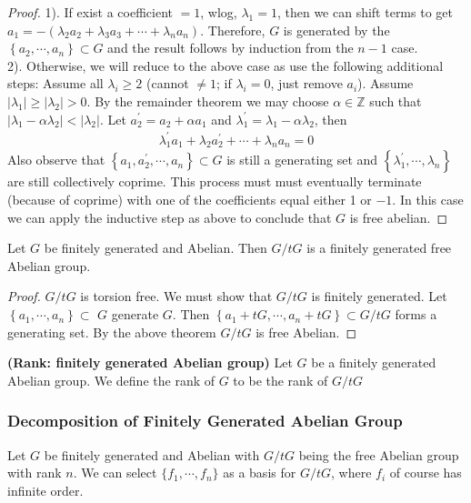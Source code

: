 \documentclass{article}
\newcommand{\bfs}[1]{\textbf{({#1}) }}
\begin{document}
\begin{proof}
1). If exist a coefficient $=1$, wlog, $\lambda_{1}=1$, then we can shift terms to get $a_{1}=-\left(\lambda_{2} a_{2}+\lambda_{3} a_{3}+\cdots+\lambda_{n} a_{n}\right) .$ Therefore, $G$ is generated by the $\left\{a_{2}, \cdots, a_{n}\right\} \subset G$ and the result follows by induction from the $n-1$ case. \\
2). Otherwise, we will reduce to the above case as use the following additional steps: Assume all $\lambda_i\ge 2$ (cannot $\ne 1$; if $\lambda_i=0$, just remove $a_i$). Assume $\left|\lambda_{1}\right| \geq\left|\lambda_{2}\right|>0 .$ By the remainder theorem we may choose $\alpha \in \mathbb{Z}$ such that $\left|\lambda_{1}-\alpha \lambda_{2}\right|<\left|\lambda_{2}\right| .$ Let $a_{2}^{\prime}=a_{2}+\alpha a_{1}$ and $\lambda_{1}^{\prime}=\lambda_{1}-\alpha \lambda_{2}$, then
\begin{align*}
\lambda_{1}^{\prime} a_{1}+\lambda_{2} a_{2}^{\prime}+\cdots+\lambda_{n} a_{n}=0
\end{align*}
Also observe that $\left\{a_{1}, a_{2}^{\prime}, \cdots, a_{n}\right\} \subset G$ is still a generating set and $\left\{\lambda_{1}^{\prime}, \cdots, \lambda_{n}\right\}$ are still collectively coprime. This process must must eventually terminate (because of coprime) with one of the coefficients equal either 1 or $-1 .$ In this case we can apply the inductive step as above to conclude that $G$ is free abelian. 
\end{proof}
\begin{thma}
Let $G$ be finitely generated and Abelian. Then $G / t G$ is a finitely generated free Abelian group.
\end{thma} 

\begin{proof}
 $G / t G$ is torsion free. We must show that $G / t G$ is finitely generated. Let $\left\{a_{1}, \cdots, a_{n}\right\} \subset$ $G$ generate $G$. Then $\left\{a_{1}+t G, \cdots, a_{n}+t G\right\} \subset G / t G$ forms a generating set. By the above theorem $G / t G$ is free Abelian. 
\end{proof}

\begin{defa}{\bfs{Rank: finitely generated Abelian group}}
 Let $G$ be a finitely generated Abelian group. We define the rank of $G$ to be the rank of $G / t G$
\end{defa} 
\subsubsection{Decomposition of Finitely Generated Abelian Group}
Let $G$ be finitely generated and Abelian with  $G / t G$ being the free Abelian group with rank $n$. We can select $\{f_{1}, \cdots, f_{n}\}$ as a basis for $G / t G$, where $f_{i}$ of course has infinite order.
\end{document}

